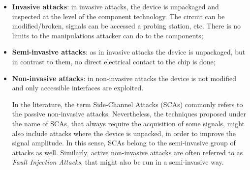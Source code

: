 \begin{itemize}
\item[] \textbf{Invasive attacks}: in invasive attacks, the device is unpackaged and inspected at the level of the component technology. The circuit can be modified/broken, signals can be accessed \via a probing station, etc. There is no limits to the manipulations attacker can do to the components;
\item[] \textbf{Semi-invasive attacks}: as in invasive attacks the device is unpackaged, but in contrast to them, no direct electrical contact to the chip is done;
\item[] \textbf{Non-invasive attacks}: in non-invasive attacks the device is not modified and only accessible interfaces are exploited. 

In the literature, the term Side-Channel Attacks (SCAs) commonly refers to the passive non-invasive attacks. Nevertheless, the techniques proposed under the name of SCAs, that always require the acquisition of some signals, might also include attacks where the device is unpacked, in order to improve the signal amplitude. In this sense, SCAs belong to the semi-invasive group of attacks as well. Similarly, active non-invasive attacks are often referred to as \emph{Fault Injection Attacks}, that might also be run in a semi-invasive way.


\end{itemize}


